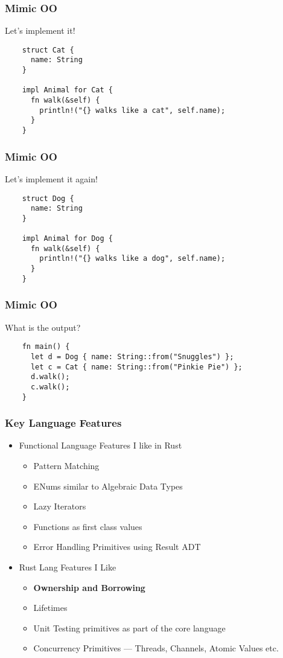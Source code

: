 \begin{frame}[fragile]
  \frametitle{Mimic OO}
  Let's implement it! \break{}
  \begin{verbatim}
    struct Cat {
      name: String
    }

    impl Animal for Cat {
      fn walk(&self) {
        println!("{} walks like a cat", self.name);
      }
    }
  \end{verbatim}
\end{frame}

\begin{frame}[fragile]
  \frametitle{Mimic OO}
  Let's implement it again! \break{}
  \begin{verbatim}
    struct Dog {
      name: String
    }

    impl Animal for Dog {
      fn walk(&self) {
        println!("{} walks like a dog", self.name);
      }
    }
  \end{verbatim}
\end{frame}

\begin{frame}[fragile]
  \frametitle{Mimic OO}
  What is the output? \break{}
  \begin{verbatim}
    fn main() {
      let d = Dog { name: String::from("Snuggles") };
      let c = Cat { name: String::from("Pinkie Pie") };
      d.walk();
      c.walk();
    }
  \end{verbatim}
\end{frame}

\begin{frame}
  \frametitle{Key Language Features}
  \begin{itemize}
  \item Functional Language Features I like in Rust
    \begin{itemize}
    \item Pattern Matching
    \item ENums similar to Algebraic Data Types
    \item Lazy Iterators
    \item Functions as first class values
    \item Error Handling Primitives using Result ADT
    \end{itemize}
  \item Rust Lang Features I Like
    \begin{itemize}
    \item \textbf{Ownership and Borrowing}
    \item Lifetimes
    \item Unit Testing primitives as part of the core language
    \item Concurrency Primitives --- Threads, Channels, Atomic Values etc.
    \end{itemize}
  \end{itemize}
\end{frame}
